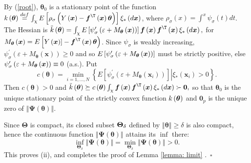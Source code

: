 \documentclass[times, authoryear, 12pt, twoside]{elsarticle}
\begin{document}
By (\ref{root}), $\boldsymbol{\theta }_{0}$ is a stationary point of the
function $k\left( \boldsymbol{\theta }\right) \overset{def}{=}\int_{\mathcal{%
\chi }}E\left[ \rho _{\sigma }\left( Y\left( \boldsymbol{x}\right) -%
\boldsymbol{f}^{\T }\left( \boldsymbol{x}\right) \boldsymbol{\theta }%
\right) \right] \xi _{\ast }\left( d\boldsymbol{x}\right) $, where $\rho
_{\sigma }(x)=\int^{x}\psi _{\sigma }\left( t\right) dt$. The Hessian is $%
\ddot{k}\left( \boldsymbol{\theta }\right) =\int_{\mathcal{\chi }}E\left[
\psi _{\sigma }^{\prime }\left( \varepsilon +M_{\boldsymbol{\theta }}\left( 
\boldsymbol{x}\right) \right) \right] \boldsymbol{f}\left( \boldsymbol{x}%
\right) \boldsymbol{f}^{\T }\left( \boldsymbol{x}\right) \xi _{\ast
}\left( d\boldsymbol{x}\right) ,$ for $M_{\boldsymbol{\theta }}\left( 
\boldsymbol{x}\right) =E\left[  Y\left( \boldsymbol{x}%
\right)] -\boldsymbol{f} ^{\T }\left( \boldsymbol{x}\right) \boldsymbol{\theta }\right) $. Since $\psi_{\sigma }$ is weakly increasing, $\psi _{\sigma }^{\prime }\left(
\varepsilon +M_{\boldsymbol{\theta }}\left( \boldsymbol{x}\right) \right)
\geq 0$ and so $E\left[ \psi _{\sigma }^{\prime }\left( \varepsilon +M_{%
\boldsymbol{\theta }}\left( \boldsymbol{x}\right) \right) \right] $ must be
strictly positive, else $\psi _{\sigma }^{\prime }\left( \varepsilon +M_{%
\boldsymbol{\theta }}\left( \boldsymbol{x}\right) \right) \equiv 0$ (a.s.).
Put 
\begin{equation*}
c\left( \boldsymbol{\theta }\right) =\min_{i=1,...,N}\left\{ E\left[ \psi
_{\sigma }^{\prime }\left( \varepsilon +M_{\boldsymbol{\theta }}\left( 
\boldsymbol{x}_{i}\right) \right) \right] \left\vert {}\right. \xi _{\ast
}\left( \boldsymbol{x}_{i}\right) >0\right\} .
\end{equation*}%
Then $c\left( \boldsymbol{\theta }\right) >0$ and $\ddot{k}\left( 
\boldsymbol{\theta }\right) \succeq c\left( \boldsymbol{\theta }\right)
\int_{\mathcal{\chi }}\boldsymbol{f}\left( \boldsymbol{x}\right) \boldsymbol{%
f}^{\T }\left( \boldsymbol{x}\right) \xi _{\ast }\left( d\boldsymbol{x}%
\right) \succ \boldsymbol{0},$ so that $\boldsymbol{\theta }_{0}$ is the
unique stationary point of the strictly convex function $k\left( \boldsymbol{%
\theta }\right) $ and $\boldsymbol{0}_p$ is the unique zero of $\left\Vert 
\boldsymbol{\Psi }\left( \boldsymbol{\theta }\right) \right\Vert $.

Since $\boldsymbol{\Theta }$ is compact, its closed subset $\boldsymbol{%
\Theta }_{\delta }$ defined by $\left\Vert \boldsymbol{\theta }\right\Vert
\geq \delta $ is also compact, hence the continuous function $\left\Vert 
\boldsymbol{\Psi }\left( \boldsymbol{\theta }\right) \right\Vert $ attains
its $\inf $ there:%
\begin{equation*}
\inf_{\boldsymbol{\Theta }_{\delta }}\left\Vert \boldsymbol{\Psi }\left( 
\boldsymbol{\theta }\right) \right\Vert =\min_{\boldsymbol{\Theta }_{\delta
}}\left\Vert \boldsymbol{\Psi }\left( \boldsymbol{\theta }\right)
\right\Vert >0.
\end{equation*}%
This proves (ii), and completes the proof of Lemma \ref{lemma: limit}%
.\hfill\ $\square $
\end{document}
